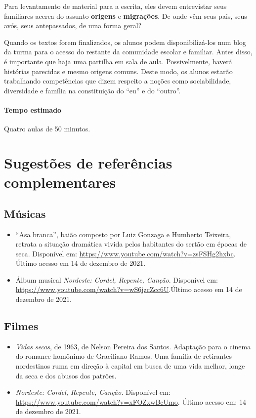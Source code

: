 \documentclass[11pt]{extarticle}
\begin{document}
Para levantamento de material para a escrita, eles devem
entrevistar seus familiares acerca do assunto \textbf{origens}
e \textbf{migrações}. De onde vêm seus pais, seus avós, seus 
antepassados, de uma forma geral? 

Quando os textos forem finalizados, os alunos podem disponibilizá-los 
num blog da turma para o acesso do restante da comunidade escolar 
e familiar. Antes disso, é importante que haja uma partilha em sala de aula.
Possivelmente, haverá histórias parecidas e mesmo origens comuns.
Deste modo, os alunos estarão trabalhando competências que dizem
respeito a noções como sociabilidade, diversidade e família na 
constituição do ``eu'' e do ``outro''.


\paragraph{Tempo estimado} Quatro aulas de 50 minutos.


\section{Sugestões de referências complementares}

\subsection{Músicas} 

\begin{itemize}
	\item ``Asa branca'', baião composto por Luiz Gonzaga e Humberto Teixeira, retrata 
a situação dramática vivida pelos habitantes do sertão em épocas de seca. Disponível em:
\url{https://www.youtube.com/watch?v=zsFSHg2hxbc}. Último acesso em 14 de dezembro de 2021.

	\item Álbum musical \textit{Nordeste: Cordel, Repente, Canção}. Disponível em: \url{https://www.youtube.com/watch?v=wS6jzcZcc6U}.Último acesso em 14 de dezembro de 2021.

\end{itemize}

\subsection{Filmes}

\begin{itemize}

	\item \textit{Vidas secas}, de 1963, de Nelson Pereira dos Santos. Adaptação para o cinema do romance homônimo
de Graciliano Ramos. Uma família de retirantes nordestinos ruma em direção à capital em busca de uma vida
melhor, longe da seca e dos abusos dos patrões. 

	\item \textit{Nordeste: Cordel, Repente, Canção.} Disponível em: \url{https://www.youtube.com/watch?v=xFOZxwBcUmo}. Último acesso em: 14 de dezembro de 2021.

\end{itemize}
\end{document}
